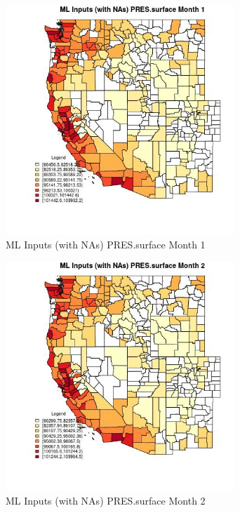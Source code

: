\begin{figure} 
\centering  
\includegraphics[width=0.77\textwidth]{Code_Outputs/Report_ML_input_PM25_Step4_part_e_de_duplicated_aves_compiled_2019-05-21wNAs_CountyPRESsurfacemedianMonth1.jpg} 
\caption{\label{fig:Report_ML_input_PM25_Step4_part_e_de_duplicated_aves_compiled_2019-05-21wNAsCountyPRESsurfacemedianMonth1}ML Inputs (with NAs) PRES.surface Month 1} 
\end{figure} 
 

\begin{figure} 
\centering  
\includegraphics[width=0.77\textwidth]{Code_Outputs/Report_ML_input_PM25_Step4_part_e_de_duplicated_aves_compiled_2019-05-21wNAs_CountyPRESsurfacemedianMonth2.jpg} 
\caption{\label{fig:Report_ML_input_PM25_Step4_part_e_de_duplicated_aves_compiled_2019-05-21wNAsCountyPRESsurfacemedianMonth2}ML Inputs (with NAs) PRES.surface Month 2} 
\end{figure} 
 

